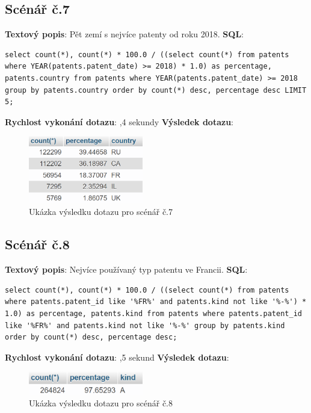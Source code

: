 \subsection{Scénář č.7}
\textbf{Textový popis}: Pět zemí s nejvíce patenty od roku 2018.
\newline
\textbf{SQL}: 
\begin{lstlisting}[label = {lst:elements_a}]
select count(*), count(*) * 100.0 / ((select count(*) from patents where YEAR(patents.patent_date) >= 2018) * 1.0) as percentage, patents.country from patents where YEAR(patents.patent_date) >= 2018 group by patents.country order by count(*) desc, percentage desc LIMIT 5;
\end{lstlisting}
\textbf{Rychlost vykonání dotazu}: ,4 sekundy
\newline
\textbf{Výsledek dotazu}:
\begin{figure}[H]
\centering
\includegraphics[width=5cm]{img/scenare/scenar_7}
\caption{Ukázka výsledku dotazu pro scénář č.7}
\label{fig:scenar7}
\end{figure}

\subsection{Scénář č.8}
\textbf{Textový popis}: Nejvíce používaný typ patentu ve Francii.
\newline
\textbf{SQL}: 
\begin{lstlisting}[label = {lst:elements_a}]
select count(*), count(*) * 100.0 / ((select count(*) from patents where patents.patent_id like '%FR%' and patents.kind not like '%-%') * 1.0) as percentage, patents.kind from patents where patents.patent_id like '%FR%' and patents.kind not like '%-%' group by patents.kind order by count(*) desc, percentage desc;
\end{lstlisting}
\textbf{Rychlost vykonání dotazu}: ,5 sekund
\newline
\textbf{Výsledek dotazu}:
\begin{figure}[H]
\centering
\includegraphics[width=5cm]{img/scenare/scenar_8}
\caption{Ukázka výsledku dotazu pro scénář č.8}
\label{fig:scenar8}
\end{figure}

